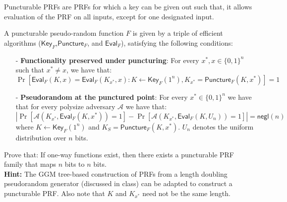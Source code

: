 \begin{exercise} Puncturable PRFs are PRFs for which a key can be given out such that, it allows evaluation of the PRF on all inputs, except for one designated input.

\newcommand{\negl}{\mathsf{negl}}
\newcommand{\A}{\mathcal{A}}
\newcommand{\F}{F}
\newcommand{\KeyF}{\mathsf{Key}_{\F}}
\newcommand{\PunctureF}{\mathsf{Puncture}_{\F}}
\newcommand{\EvalF}{\mathsf{Eval}_{\F}}


A puncturable pseudo-random function $\F$ is given by a triple of efficient algorithms ($\KeyF$,$\PunctureF$, and $\EvalF$), satisfying the following conditions:
\begin{itemize}
\item[-] \textbf{Functionality preserved under puncturing}: For every $x^*, x \in \{0,1\}^{n}$ such that $x^* \neq x$, we have that:
    $$\Pr[\EvalF(K,x) = \EvalF(K_{x^*},x) : K \gets \KeyF(1^n), K_{x^*} = \PunctureF(K,x^*)] = 1$$
\item[-] \textbf{Pseudorandom at the punctured point}: For every $x^*\in \{0,1\}^n$ we have that for every polysize adversary $\A$ we have that:
    $$|\Pr[\A(K_{x^*}, \EvalF(K,x^*)) = 1] - \Pr[\A(K_{x^*}, \EvalF(K,U_n)) = 1]|= \negl(n)$$
    where $K \gets \KeyF(1^n)$ and $K_S = \PunctureF(K,x^*)$. $U_n$ denotes the uniform distribution over $n$ bits.
\end{itemize}

Prove that: If one-way functions exist, then there exists a puncturable PRF family that maps $n$ bits to $n$ bits. \\ 
\textbf{Hint:} The GGM tree-based construction of PRFs from a length doubling pseudorandom generator (discussed in class) can be adapted to construct a puncturable PRF. Also note that $K$ and $K_{x^*}$ need not be the same length.
\end{exercise}
%
%
%